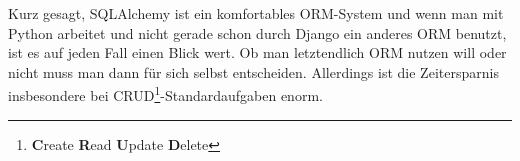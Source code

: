 Kurz gesagt, SQLAlchemy ist ein komfortables ORM-System und wenn man mit Python
arbeitet und nicht gerade schon durch Django ein anderes ORM benutzt, ist es auf
jeden Fall einen Blick wert. Ob man letztendlich ORM nutzen will oder nicht muss
man dann für sich selbst entscheiden. Allerdings ist die Zeitersparnis
insbesondere bei CRUD\footnote{\textbf{C}reate \textbf{R}ead \textbf{U}pdate
\textbf{D}elete}-Standardaufgaben enorm.

